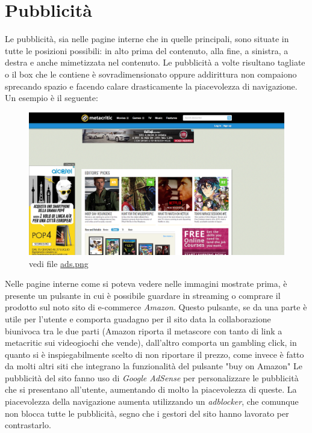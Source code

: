 \documentclass[12pt]{article}
\begin{document}
\section{Pubblicità}
Le pubblicità, sia nelle pagine interne che in quelle principali, sono situate in tutte le posizioni possibili: in alto prima del contenuto, alla fine, a sinistra, a destra e anche mimetizzata nel contenuto. Le pubblicità a volte risultano tagliate o il box che le contiene è sovradimensionato oppure addirittura non compaiono sprecando spazio e facendo calare drasticamente la piacevolezza di navigazione. Un esempio è il seguente:
\begin{figure}[H]
	\begin{center}
		\includegraphics[width=13.5cm]{ads.png}
		\caption{vedi file \href{ads.png}{ads.png}}
	\end{center}
\end{figure}
Nelle pagine interne come si poteva vedere nelle immagini mostrate prima, è presente un pulsante in cui è possibile guardare in streaming o comprare il prodotto sul noto sito di e-commerce \textit{Amazon}. Questo pulsante, se da una parte è utile per l'utente e comporta guadagno per il sito data la collaborazione biunivoca tra le due parti (Amazon riporta il metascore con tanto di link a metacritic sui videogiochi che vende), dall'altro comporta un gambling click, in quanto si è inspiegabilmente scelto di non riportare il prezzo, come invece è fatto da molti altri siti che integrano la funzionalità del pulsante "buy on Amazon"
Le pubblicità del sito fanno uso di \textit{Google AdSense} per personalizzare le pubblicità che si presentano all'utente, aumentando di molto la piacevolezza di queste.
La piacevolezza della navigazione aumenta utilizzando un \textit{adblocker}, che comunque non blocca tutte le pubblicità, segno che i gestori del sito hanno lavorato per contrastarlo.
\newpage
\end{document}
